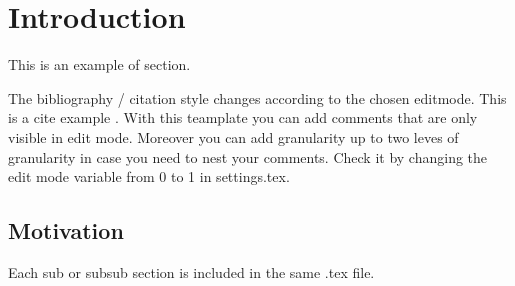 \section{Introduction}

This is an example of section. 

The bibliography / citation style changes according to the chosen editmode. This is a cite example \cite{leeson2007arrgh}. 
With this teamplate you can add comments that are only visible in edit mode. 
Moreover you can add granularity up to two leves of granularity in case you need to nest your comments.
Check it by changing the edit mode variable from 0 to 1 in settings.tex.


\subsection{Motivation}

Each sub or subsub section is included in the same .tex file.

